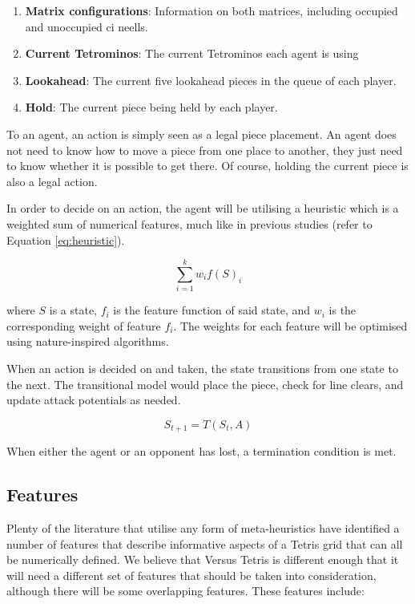 \documentclass[a4paper, 12pt]{extreport}
\begin{document}
				\begin{enumerate}
					\item \textbf{Matrix configurations}: Information on both matrices, including occupied and unoccupied ci neells.
					\item \textbf{Current Tetrominos}: The current Tetrominos each agent is using
					\item \textbf{Lookahead}: The current five lookahead pieces in the queue of each player.
					\item \textbf{Hold}: The current piece being held by each player.
				\end{enumerate}
				
				To an agent, an action is simply seen as a legal piece placement. An agent does not need to know how to move a piece from one place to another, they just need to know whether it is possible to get there. Of course, holding the current piece is also a legal action.
				
				In order to decide on an action, the agent will be utilising a heuristic which is a weighted sum of numerical features, much like in previous studies (refer to Equation \ref{eq:heuristic}).
				
				\begin{equation} 
					\sum_{i=1}^{k} w_i f(S)_i
				\end{equation}\label{eq:heuristic}
				
				\noindent where $S$ is a state, $f_i$ is the feature function of said state, and $w_i$ is the corresponding weight of feature $f_i$. The weights for each feature will be optimised using nature-inspired algorithms.
				
				When an action is decided on and taken, the state transitions from one state to the next. The transitional model would place the piece, check for line clears, and update attack potentials as needed.
				
				\begin{equation}
					S_{t+1} = T(S_t, A)
				\end{equation}
				
				When either the agent or an opponent has lost, a termination condition is met.
				
			\subsection{Features}
				
				Plenty of the literature that utilise any form of meta-heuristics have identified a number of features that describe informative aspects of a Tetris grid that can all be numerically defined. We believe that Versus Tetris is different enough that it will need a different set of features that should be taken into consideration, although there will be some overlapping features. These features include:
				
\end{document}

